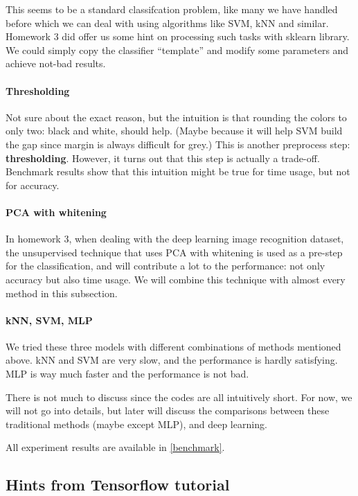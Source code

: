 \documentclass[a4paper,10pt,UTF8]{article}
\numberwithin{equation}{section}
\numberwithin{figure}{section}
\begin{document}
This seems to be a standard classifcation problem, like many we have handled before which we can deal with using algorithms like SVM, kNN and similar. Homework 3 did offer us some hint on processing such tasks with sklearn library. We could simply copy the classifier ``template'' and modify some parameters and achieve not-bad results.

\paragraph{Thresholding} Not sure about the exact reason, but the intuition is that rounding the colors to only two: black and white, should help. (Maybe because it will help SVM build the gap since margin is always difficult for grey.) This is another preprocess step: \textbf{thresholding}. However, it turns out that this step is actually a trade-off. Benchmark results show that this intuition might be true for time usage, but not for accuracy. 

\paragraph{PCA with whitening} In homework 3, when dealing with the deep learning image recognition dataset, the unsupervised technique that uses PCA with whitening is used as a pre-step for the classification, and will contribute a lot to the performance: not only accuracy but also time usage. We will combine this technique with almost every method in this subsection.

\paragraph{kNN, SVM, MLP} We tried these three models with different combinations of methods mentioned above. kNN and SVM are very slow, and the performance is hardly satisfying. MLP is way much faster and the performance is not bad.

There is not much to discuss since the codes are all intuitively short. For now, we will not go into details, but later will discuss the comparisons between these traditional methods (maybe except MLP), and deep learning.

All experiment results are available in \autoref{benchmark}.

\subsection{Hints from Tensorflow tutorial}
\end{document}
